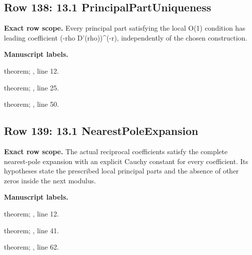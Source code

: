 \subsection{Row 138: 13.1 PrincipalPartUniqueness}
\label{row:138}
\textbf{Exact row scope.} Every principal part satisfying the local O(1) condition has leading coefficient (-rho D'(rho))\textasciicircum{}(-r), independently of the chosen construction.\par\smallskip
\textbf{Manuscript labels.} \par\smallskip
{\small{}\par}
{\footnotesize\color{muted}theorem; , line 12.\par}\smallskip
{\small{}\par}
{\footnotesize\color{muted}theorem; , line 25.\par}\smallskip
{\small{}\par}
{\footnotesize\color{muted}theorem; , line 50.\par}\smallskip
{}
\subsection{Row 139: 13.1 NearestPoleExpansion}
\label{row:139}
\textbf{Exact row scope.} The actual reciprocal coefficients satisfy the complete nearest-pole expansion with an explicit Cauchy constant for every coefficient. Its hypotheses state the prescribed local principal parts and the absence of other zeros inside the next modulus.\par\smallskip
\textbf{Manuscript labels.} \par\smallskip
{\small{}\par}
{\footnotesize\color{muted}theorem; , line 12.\par}\smallskip
{\small{}\par}
{\footnotesize\color{muted}theorem; , line 41.\par}\smallskip
{\small{}\par}
{\footnotesize\color{muted}theorem; , line 62.\par}\smallskip
{}
